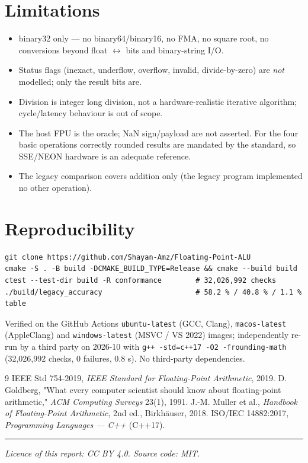 \documentclass[11pt,a4paper]{article}
\begin{document}
\section{Limitations}
\begin{itemize}[nosep]
  \item binary32 only — no binary64/binary16, no FMA, no square root, no conversions beyond float $\leftrightarrow$ bits and binary-string I/O.
  \item Status flags (inexact, underflow, overflow, invalid, divide-by-zero) are \emph{not} modelled; only the result bits are.
  \item Division is integer long division, not a hardware-realistic iterative algorithm; cycle/latency behaviour is out of scope.
  \item The host FPU is the oracle; NaN sign/payload are not asserted. For the four basic operations correctly rounded results are mandated by the standard, so SSE/NEON hardware is an adequate reference.
  \item The legacy comparison covers addition only (the legacy program implemented no other operation).
\end{itemize}
\section{Reproducibility}
\begin{verbatim}
git clone https://github.com/Shayan-Amz/Floating-Point-ALU
cmake -S . -B build -DCMAKE_BUILD_TYPE=Release && cmake --build build
ctest --test-dir build -R conformance        # 32,026,992 checks
./build/legacy_accuracy                      # 58.2 % / 40.8 % / 1.1 % table
\end{verbatim}
Verified on the GitHub Actions \texttt{ubuntu-latest} (GCC, Clang), \texttt{macos-latest} (AppleClang) and \texttt{windows-latest} (MSVC / VS 2022) images; independently re-run by a third party on 2026-10 with \texttt{g++ -std=c++17 -O2 -frounding-math} (32,026,992 checks, 0 failures, 0.8 s). No third-party dependencies.

\begin{thebibliography}{9}
 IEEE Std 754-2019, \emph{IEEE Standard for Floating-Point Arithmetic}, 2019.
 D. Goldberg, "What every computer scientist should know about floating-point arithmetic," \emph{ACM Computing Surveys} 23(1), 1991.
 J.-M. Muller et al., \emph{Handbook of Floating-Point Arithmetic}, 2nd ed., Birkhäuser, 2018.
 ISO/IEC 14882:2017, \emph{Programming Languages — C++} (C++17).
\end{thebibliography}
\vspace{1em}\hrule\vspace{4pt}\footnotesize \emph{Licence of this report: CC BY 4.0. Source code: MIT.}
\end{document}
